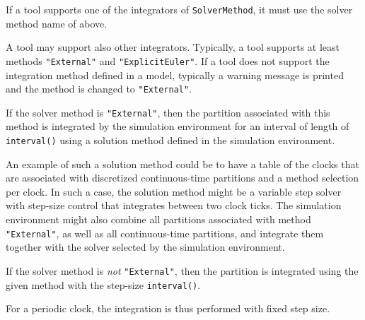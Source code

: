 If a tool supports one of the integrators of \lstinline!SolverMethod!, it must use the solver method name of above.

\begin{nonnormative}
A tool may support also other integrators.  Typically, a tool supports at least methods \lstinline!"External"! and \lstinline!"ExplicitEuler"!. If a tool does not support the
integration method defined in a model, typically a warning message is printed and the method is changed to \lstinline!"External"!.
\end{nonnormative}

If the solver method is \lstinline!"External"!, then the partition associated with this method is integrated by the simulation environment for an interval of length of
\lstinline!interval()! using a solution method defined in the simulation environment.

\begin{nonnormative}
An example of such a solution method could be to have a table of the clocks that are associated with discretized continuous-time partitions and a method selection per clock.  In such
a case, the solution method might be a variable step solver with step-size control that integrates between two clock ticks. The simulation environment might also combine all partitions associated with method \lstinline!"External"!, as well as all continuous-time partitions, and integrate them together with the solver selected by the simulation environment.
\end{nonnormative}

If the solver method is \emph{not} \lstinline!"External"!, then the partition is
integrated using the given method with the step-size \lstinline!interval()!.

\begin{nonnormative}
For a periodic clock, the integration is thus performed with fixed step size.
\end{nonnormative}

